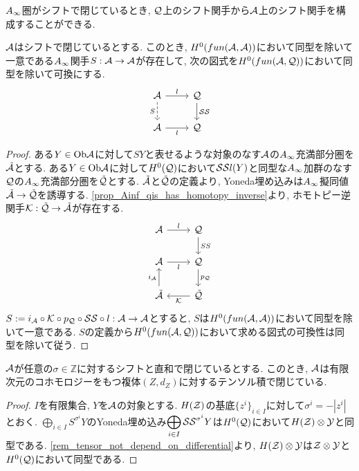 \documentclass[uplatex, a4paper, 14Q, dvipdfmx]{jsarticle}
\begin{document}
$A_{\infty}$圏がシフトで閉じているとき, $\mathcal{Q}$上のシフト関手から$\mathcal{A}$上のシフト関手を構成することができる. 

\begin{lemma}
  $\mathcal{A}$はシフトで閉じているとする.
  このとき, $H^0(fun (\mathcal{A}, \mathcal{A}))$において同型を除いて一意である$A_{\infty}$関手$S : \mathcal{A} \to \mathcal{A}$が存在して, 次の図式を$H^0(fun (\mathcal{A}, \mathcal{Q}))$において同型を除いて可換にする.
  \[\begin{tikzcd}
    \A & \Q \\
    \A & \Q
    \arrow["l", from=1-1, to=1-2]
    \arrow["\SS", from=1-2, to=2-2]
    \arrow["S"', dashed, from=1-1, to=2-1]
    \arrow["l"', from=2-1, to=2-2]
  \end{tikzcd}\]
\end{lemma}

\begin{proof}
  ある$Y \in \mathrm{Ob}\mathcal{A}$に対して$SY$と表せるような対象のなす$\mathcal{A}$の$A_{\infty}$充満部分圏を$\tilde{\mathcal{A}}$とする.
  ある$Y \in \mathrm{Ob}\mathcal{A}$に対して$H^0(\mathcal{Q})$において$\mathcal{SS} l(Y)$と同型な$A_{\infty}$加群のなす$\mathcal{Q}$の$A_{\infty}$充満部分圏を$\tilde{\mathcal{Q}}$とする.
  $\tilde{\mathcal{A}}$と$\tilde{\mathcal{Q}}$の定義より, Yoneda埋め込みは$A_{\infty}$擬同値$\tilde{\mathcal{A}} \to \tilde{\mathcal{Q}}$を誘導する.
  \cref{prop_Ainf_qis_has_homotopy_inverse}より, ホモトピー逆関手$\mathcal{K} : \tilde{\mathcal{Q}} \to \tilde{\mathcal{A}}$が存在する.
  \[\begin{tikzcd}
    \A & \Q \\
    \A & \Q \\
    \tilA & \tilQ
    \arrow["l", from=1-1, to=1-2]
    \arrow["SS", from=1-2, to=2-2]
    \arrow["l"', from=2-1, to=2-2]
    \arrow["{p_\Q}", from=2-2, to=3-2]
    \arrow["\K", from=3-2, to=3-1]
    \arrow["{i_\A}", from=3-1, to=2-1]
  \end{tikzcd}\]
  $S := i_{\mathcal{A}} \circ \mathcal{K} \circ p_{\mathcal{Q}} \circ \mathcal{SS} \circ l : \mathcal{A} \to \mathcal{A}$とすると, $S$は$H^0(fun (\mathcal{A}, \mathcal{A}))$において同型を除いて一意である.
  $S$の定義から$H^0(fun (\mathcal{A}, \mathcal{Q}))$において求める図式の可換性は同型を除いて従う.
\end{proof}

\begin{lemma}
  $\mathcal{A}$が任意の$\sigma \in \mathbb{Z}$に対するシフトと直和で閉じているとする.
  このとき, $\mathcal{A}$は有限次元のコホモロジーをもつ複体$(Z,d_Z)$に対するテンソル積で閉じている. 
\end{lemma}

\begin{proof}
  $I$を有限集合, $Y$を$\mathcal{A}$の対象とする.
  $H(\mathcal{Z})$の基底$\{z^i\}_{i \in I}$に対して$\sigma^i = -|z^i|$とおく.
  $\displaystyle \bigoplus_{i \in I} S^{\sigma^i}Y$のYoneda埋め込み$\displaystyle \bigoplus_{i \in I} \mathcal{SS}^{\sigma^i}Y$は$H^0(\mathcal{Q})$において$H(\mathcal{Z}) \otimes \mathcal{Y}$と同型である.
  \cref{rem_tensor_not_depend_on_differential}より, $H(\mathcal{Z}) \otimes \mathcal{Y}$は$\mathcal{Z} \otimes \mathcal{Y}$と$H^0(\mathcal{Q})$において同型である. 
\end{proof}
\end{document}
